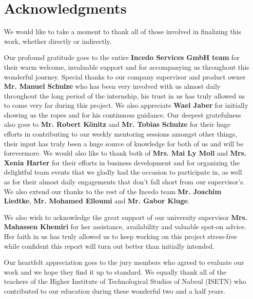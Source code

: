 \section*{Acknowledgments}
We would like to take a moment to thank all of those involved in finalizing this work, whether directly or indirectly.

Our profound gratitude goes to the entire \textbf{Incedo Services GmbH team} for their warm welcome, invaluable support and for accompanying us throughout this wonderful journey.
Special thanks to our company supervisor and product owner \textbf{Mr. Manuel Schulze} who has been very involved with us almost daily throughout the long period of the internship, his trust in us has truly allowed us to come very far during this project.
We also appreciate \textbf{Wael Jaber} for initially showing us the ropes and for his continuous guidance.
Our deepest gratefulness also goes to \textbf{Mr. Robert Könitz} and \textbf{Mr. Tobias Schulze} for their huge efforts in contributing to our weekly mentoring sessions amongst other things, their input has truly been a huge source of knowledge for both of us and will be forevermore.
We would also like to thank both of \textbf{Mrs. Mai Ly Moll} and \textbf{Mrs. Xenia Harter} for their efforts in business development and for organizing the delightful team events that we gladly had the occasion to participate in, as well as for their almost daily engagements that don't fall short from our supervisor's. We also extend our thanks to the rest of the Incedo team \textbf{Mr. Joachim Liedtke}, \textbf{Mr. Mohamed Elloumi} and \textbf{Mr. Gabor Kluge}.

We also wish to acknowledge the great support of our university supervisor \textbf{Mrs. Mahassen Khemiri} for her assistance, availability and valuable spot-on advice.
Her faith in us has truly allowed us to keep working on this project stress-free while confident this report will turn out better than initially intended.

Our heartfelt appreciation goes to the jury members who agreed to evaluate our work and we hope they find it up to standard.
We equally thank all of the teachers of the Higher Institute of Technological Studies of Nabeul (ISETN) who contributed to our education during these wonderful two and a half years.


\newpage
